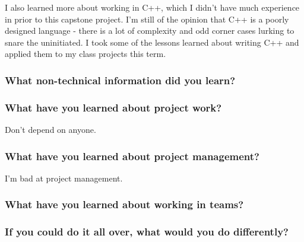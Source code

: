 I also learned more about working in C++, which I didn't have much experience in prior to this capstone project. I'm still of the opinion that C++ is a poorly designed language - there is a lot of complexity and odd corner cases lurking to snare the uninitiated. I took some of the lessons learned about writing C++ and applied them to my class projects this term.

\subsubsection{What non-technical information did you learn?}


\subsubsection{What have you learned about project work?}
Don't depend on anyone.

\subsubsection{What have you learned about project management?}
I'm bad at project management.

\subsubsection{What have you learned about working in teams?}


\subsubsection{If you could do it all over, what would you do differently?}
